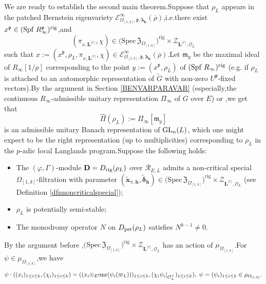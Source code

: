 \documentclass[SecEq,CM,GP]{degruyter-crelle} %
\theoremstyle{plain}
\newcommand{\bersteineigenvarpik}{{\mathcal{E}_{\omepik,\fp,\bm{\lambda}_\bh}^\infty(\overline{\rho})}}
\newcommand{\Dpik}{{\mathbf{D}}}
\newcommand{\GLN}{{\rm GL}}
\newcommand{\lrr}{{\langle r\rangle}}
\newcommand{\omepik}{\Omega_{[1,k]}}
\newcommand{\pst}{{\rm pst}}
\newcommand{\rig}{{\rm rig}}
\newcommand{\rigch}{{\mathcal{Z}_{\bL^{\lrr},\mathcal{O}_L}}}
\newcommand{\Spf}{{\mathrm{Spf}}}
\newcommand{\sbanpik}{{\big(\mathrm{Spec}\hspace{2pt}\mathfrak{Z}_{\omepik}\big)^{\mathrm{rig}}}}
\newcommand{\te}{{\otimes_E}}
\newcommand{\unr}{{\rm unr}}
\newcommand{\bL}{{\mathbf{L}}}
\newcommand{\bx}{{\mathbf{x}}}
\newcommand{\bh}{{\mathbf{h}}}
\newcommand{\cR}{\mathcal R}
\newcommand{\cO}{\mathcal O}
\newcommand{\fm}{{\mathfrak{m}}}
\newcommand{\fp}{{\mathfrak{p}}}
\begin{document}
We are ready to establish the second main theorem.\;Suppose that $\rho_L$ appears in the patched Bernstein eigenvariety $\bersteineigenvarpik$,\;i.e.\;there exist  $x^{\fp}\in (\Spf\;R_{\infty}^{\fp})^{\rig}$,\;and  $$(\pi_{x,\bL^{\lrr}},\chi)\in \sbanpik\times\rigch $$ such that $x:=(x^{\fp}, \rho_L, \pi_{x,\bL^{\lrr}},\chi)\in \bersteineigenvarpik$.\;Let $\fm_y$ be the maximal ideal of $R_{\infty}[1/p]$ corresponding to the point $y:=(x^{\fp}, \rho_L)$ of $(\Spf\;R_{\infty})^{\rig}$ (e.g. if $\rho_L$ is attached to an automorphic representation of $\widetilde{G}$ with non-zero $U^{\fp}$-fixed vectors).\;By the argument in Section \ref{BENVARPARAVAR} (especially,\;the continuous $R_{\infty}$-admissible unitary representation $\Pi_{\infty}$ of $G$ over $E$) or  
\cite{PATCHING2016},\;we get that 
\begin{equation*}
\widehat{\Pi}(\rho_L):=\Pi_{\infty}[\fm_y]
\end{equation*}
is an admissible unitary Banach representation of $\GLN_n(L)$, which one might expect to be the right representation (up to multiplicities) corresponding to $\rho_L$ in the $p$-adic local Langlands program.\;Suppose the following holds:
\begin{itemize}
\item[(a)] The $(\varphi,\Gamma)$-module $\Dpik=D_{\rig}(\rho_L)$ over $\cR_{E,L}$ admits a non-critical special $\omepik$-filtration  with parameter $(\widetilde{\bx}_{\pi,\bh},\widetilde{\bm{\delta}}_\bh)\in \sbanpik\times\rigch $ (see Definition \ref{dfnnoncriticalspecial});
\item[(b)] $\rho_L$ is potentially semi-stable;
\item[(c)] The monodromy operator $N$ on $D_{\pst}(\rho_L)$ satisfies $N^{k-1}\neq 0$.
\end{itemize}
By the argument before \cite[Corollary 3.1.11]{Ding2021},\;$ \sbanpik\times\rigch $ has an action of $\mu_{\omepik}$.\;For $\psi\in \mu_{\omepik}$,\;we have
\[{\psi}\cdot((x_i)_{1\leq i\leq k},(\chi_i)_{1\leq i\leq k})=((x_i\te \unr(\psi_i(\varpi_L)))_{1\leq i\leq k},(\chi_i\psi_i|_{\cO_L^\times})_{1\leq i\leq k}),\;{\psi}=(\psi_i)_{1\leq i\leq k}\in \mu_{\omepik}.\]
\end{document}

